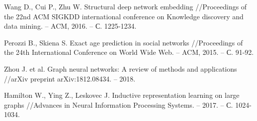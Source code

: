 \begin{thebibliography}{9}
Wang D., Cui P., Zhu W. Structural deep network embedding //Proceedings of the 22nd ACM SIGKDD international conference on Knowledge discovery and data mining. – ACM, 2016. – С. 1225-1234.

Perozzi B., Skiena S. Exact age prediction in social networks //Proceedings of the 24th International Conference on World Wide Web. – ACM, 2015. – С. 91-92.

Zhou J. et al. Graph neural networks: A review of methods and applications //arXiv preprint arXiv:1812.08434. – 2018.

Hamilton W., Ying Z., Leskovec J. Inductive representation learning on large graphs //Advances in Neural Information Processing Systems. – 2017. – С. 1024-1034.

\end{thebibliography}
\endgroup

\clearpage